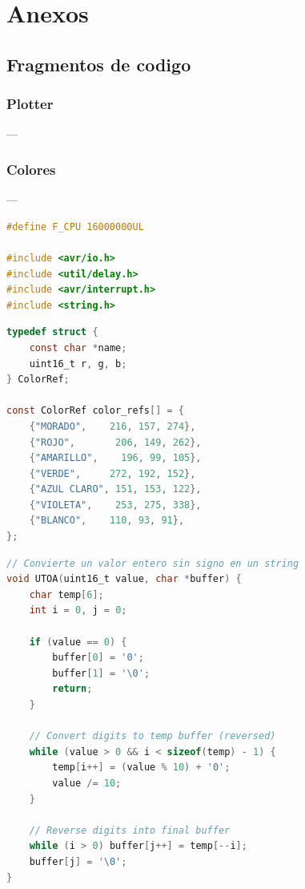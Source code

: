 \section{Anexos}

\subsection{Fragmentos de codigo}

\subsubsection{Plotter}---

\subsubsection{Colores}---

\begin{lstlisting}[language=C, caption={Librerias utilizadas}]
#define F_CPU 16000000UL

#include <avr/io.h>
#include <util/delay.h>
#include <avr/interrupt.h>
#include <string.h>
\end{lstlisting}

\begin{lstlisting}[language=C, caption={Mapeado de colores}]
typedef struct {
	const char *name;
	uint16_t r, g, b;
} ColorRef;

const ColorRef color_refs[] = {
	{"MORADO",    216, 157, 274},
	{"ROJO",       206, 149, 262},
	{"AMARILLO",    196, 99, 105},
	{"VERDE",     272, 192, 152},
	{"AZUL CLARO", 151, 153, 122},
	{"VIOLETA",    253, 275, 338},
	{"BLANCO",    110, 93, 91},
};
\end{lstlisting}

\begin{lstlisting}[language=C, caption={Convertidor de unsigned integer a string}]
// Convierte un valor entero sin signo en un string
void UTOA(uint16_t value, char *buffer) { 
	char temp[6];
	int i = 0, j = 0;

	if (value == 0) {
		buffer[0] = '0';
		buffer[1] = '\0';
		return;
	}

	// Convert digits to temp buffer (reversed)
	while (value > 0 && i < sizeof(temp) - 1) {
		temp[i++] = (value % 10) + '0';
		value /= 10;
	}

	// Reverse digits into final buffer
	while (i > 0) buffer[j++] = temp[--i];
	buffer[j] = '\0';
}
\end{lstlisting}

